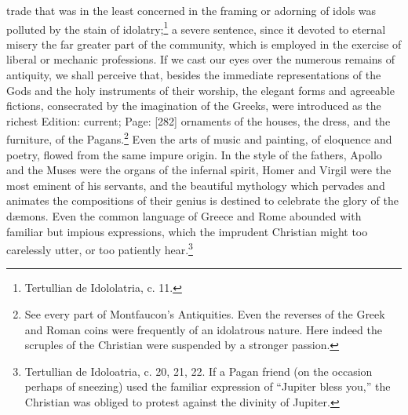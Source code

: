 trade that was in the least concerned in the framing or adorning of idols was polluted by the stain of idolatry;\footnote{Tertullian de Idololatria, c. 11.} a severe sentence, since it devoted to eternal misery the far greater part of the community, which is employed in the exercise of liberal or mechanic professions. If we cast our eyes over the numerous remains of antiquity, we shall perceive that, besides the immediate representations of the Gods and the holy instruments of their worship, the elegant forms and agreeable fictions, consecrated by the imagination of the Greeks, were introduced as the richest Edition: current; Page: [282] ornaments of the houses, the dress, and the furniture, of the Pagans.\footnote{See every part of Montfaucon\texthebrew{}’s Antiquities. Even the reverses of the Greek and Roman coins were frequently of an idolatrous nature. Here indeed the scruples of the Christian were suspended by a stronger passion.} Even the arts of music and painting, of eloquence and poetry, flowed from the same impure origin. In the style of the fathers, Apollo and the Muses were the organs of the infernal spirit, Homer and Virgil were the most eminent of his servants, and the beautiful mythology which pervades and animates the compositions of their genius is destined to celebrate the glory of the dæmons. Even the common language of Greece and Rome abounded with familiar but impious expressions, which the imprudent Christian might too carelessly utter, or too patiently hear.\footnote{Tertullian de Idoloatria, c. 20, 21, 22. If a Pagan friend (on the occasion perhaps of sneezing) used the familiar expression of \texthebrew{“}Jupiter bless you,\texthebrew{}” the Christian was obliged to protest against the divinity of Jupiter.}

